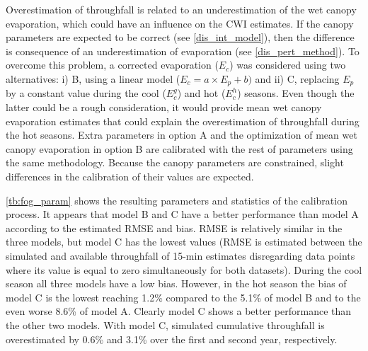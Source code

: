 \documentclass[a4paper,12pt]{article}
\begin{document}
\begin{linenumbers}
Overestimation of throughfall is related to an underestimation of the wet canopy evaporation, which could have an influence on the CWI estimates. If the canopy parameters are expected to be correct (see \autoref{dis_int_model}), then the difference is consequence of an underestimation of evaporation (see \autoref{dis_pert_method}). To overcome this problem, a corrected evaporation ($E_c$) was considered using two alternatives: i) B, using a linear model ($E_c = a \times E_p + b)$ and ii) C, replacing $E_p$ by a constant value during the cool ($E^g_c$) and hot ($E^h_c$) seasons. Even though the latter could be a rough consideration, it would provide mean wet canopy evaporation estimates that could explain the overestimation of throughfall during the hot seasons. Extra parameters in option A and the optimization of mean wet canopy evaporation in option B are calibrated with the rest of parameters using the same methodology. Because the canopy parameters are constrained, slight differences in the calibration of their values are expected. 

\autoref{tb:fog_param} shows the resulting parameters and statistics of the calibration process. It appears that model B and C have a better performance than model A according to the estimated RMSE and bias. RMSE is relatively similar in the three models, but model C has the lowest values (RMSE is estimated between the simulated and available throughfall of 15-min estimates disregarding data points where its value is equal to zero simultaneously for both datasets). During the cool season all three models have a low bias. However, in the hot season the bias of model C is the lowest reaching 1.2\% compared to the 5.1\% of model B and to the even worse 8.6\% of model A. Clearly model C shows a better performance than the other two models. With model C, simulated cumulative throughfall is overestimated by 0.6\% and 3.1\% over the first and second year, respectively.





\end{linenumbers}
\end{document}
